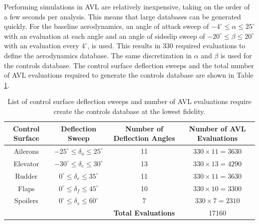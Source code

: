 Performing simulations in AVL are relatively inexpensive, taking on the order of a few seconds per analysis. 
This means that large databases can be generated quickly. 
For the baseline aerodynamics, an angle of attack sweep of $-4 ^\circ \leq \alpha \leq 25 ^\circ$ with an evaluation at each angle and an angle of sideslip sweep of $-20 ^\circ \leq \beta \leq 20 ^\circ$ with an evaluation every $4^\circ$, is used. 
This results in 330 required evaluations to define the aerodynamics database.
The same discretization in $\alpha$ and $\beta$ is used for the controls database. 
The control surface deflection sweeps and the total number of AVL evaluations required to generate the controls database are shown in Table \ref{tab:avl_data_points}.

\begin{table}
    \renewcommand{\arraystretch}{1.2}
    \centering
    \begin{tabular}{ c|c|c|c } 
         Control Surface & Deflection Sweep & Number of Deflection Angles & Number of AVL Evaluations \\ 
         \hline
         Ailerons &  $-25^\circ \leq \delta_a \leq 25^\circ$ & 11 & $330 \times 11 = 3630$\\
         Elevator &  $-30^\circ \leq \delta_e \leq 30^\circ$ & 13 & $330 \times 13 = 4290$\\
         Rudder & $0^\circ \leq \delta_r \leq 35^\circ$ & 11 & $330 \times 11 = 3630$\\
         Flaps & $0^\circ \leq \delta_f \leq 45^\circ$ & 10 & $330 \times 10 = 3300$\\
         Spoilers & $0^\circ \leq \delta_s \leq 60^\circ$ & 7 & $330 \times 7 = 2310$\\
         \hline
         & & \textbf{Total Evaluations} & 17160
         
    \end{tabular}
    \caption{List of control surface deflection sweeps and number of AVL evaluations require create the controls database at the lowest fidelity.}
    \label{tab:avl_data_points}
\end{table}

